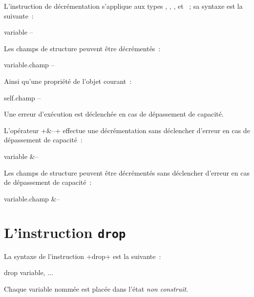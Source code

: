 L'instruction de décrémentation s'applique aux types , , ,  et ~; sa syntaxe est la suivante~:

\begin{galgas3box}
variable --
\end{galgas3box}

Les champs de structure peuvent être décrémentés~:
\begin{galgas3box}
variable.champ --
\end{galgas3box}


Ainsi qu'une propriété de l'objet courant~:
\begin{galgas3box}
self.champ --
\end{galgas3box}

Une erreur d'exécution est déclenchée en cas de dépassement de capacité.

L'opérateur \ggst+&--+ effectue une décrémentation sans déclencher d'erreur en cas de dépassement de capacité~:
\begin{galgas3box}
variable &--
\end{galgas3box}

Les champs de structure peuvent être décrémentés sans déclencher d'erreur en cas de dépassement de capacité~:
\begin{galgas3box}
variable.champ &--
\end{galgas3box}




\section{L'instruction \texttt{drop}}

La syntaxe de l'instruction \ggst+drop+ est la suivante~:

\begin{galgas3box}
drop variable, ...
\end{galgas3box}

Chaque variable nommée est placée dans l'état \emph{non construit}.








